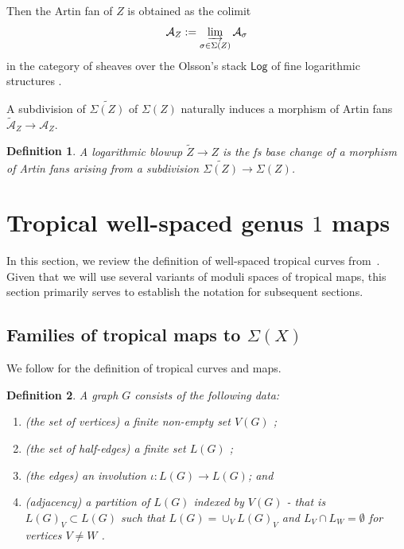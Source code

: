\documentclass{article}
\newtheorem{definition}{Definition}[section]
\begin{document}
Then the Artin fan of $Z$ is obtained as the colimit
\[
\mathcal{A}_Z := \varinjlim_{\sigma \in \Sigma(Z)} \mathcal{A}_\sigma
\]
in the category of sheaves over the Olsson's stack $\mathsf{Log}$ of fine logarithmic structures \cite{Olsson03}.

A subdivision of $\widetilde{\Sigma(Z)}$ of $\Sigma(Z)$ naturally induces a morphism of Artin fans $\widetilde{\mathcal{A}}_Z \longrightarrow \mathcal{A}_Z$. 
\begin{definition}
    A logarithmic blowup $\widetilde{Z} \to Z$ is  the fs base change of a morphism of Artin fans arising from a subdivision  $\widetilde{\Sigma(Z)} \to \Sigma(Z)$. 
\end{definition}


\section{Tropical well-spaced genus $1$ maps} \label{sec: tropical definitions}


    In this section, we review the definition of well-spaced tropical curves from~\cite{RSWII}. Given that we will use several variants of moduli spaces of tropical maps, this section primarily serves to establish the notation for subsequent sections.

    \subsection{Families of tropical maps to $\Sigma(X)$}

    We follow \cite{ACGSI} for the definition of tropical curves and maps. 

    \begin{definition}\cite[Definition 2.16]{GeomAC-ACG}
        A graph $G$ consists of the following data: 
        \begin{enumerate}
            \item (the set of vertices) a finite non-empty set $ V(G)$ ; 
            \item (the set of half-edges) a finite set $ L(G)$ ; 
            \item (the edges) an involution $\iota: L(G) \rightarrow L(G)$; and 
            \item (adjacency) a partition of $L(G)$ indexed by $V(G)$ - that is  $L(G)_V \subset L(G)$ such that $L(G) = \cup_V L(G)_V$ and $L_V \cap L_W = \emptyset$ for vertices $V \neq W$ . 
        \end{enumerate}
    \end{definition}
\end{document}
